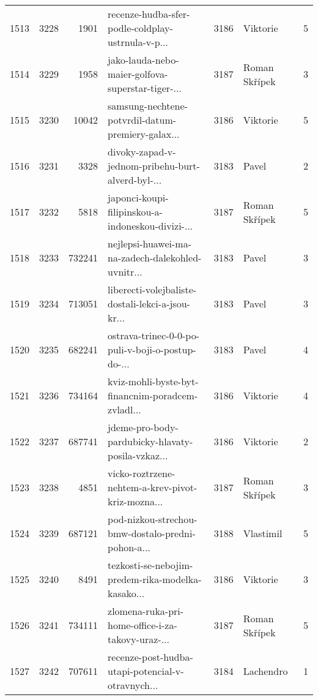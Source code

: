 \begin{tabular}{lrrlrlr}
1513 &       3228 &     1901 &  recenze-hudba-sfer-podle-coldplay-ustrnula-v-p... &     3186 &                     Viktorie &               5 \\
1514 &       3229 &     1958 &  jako-lauda-nebo-maier-golfova-superstar-tiger-... &     3187 &                Roman Skřípek &               3 \\
1515 &       3230 &    10042 &  samsung-nechtene-potvrdil-datum-premiery-galax... &     3186 &                     Viktorie &               5 \\
1516 &       3231 &     3328 &  divoky-zapad-v-jednom-pribehu-burt-alverd-byl-... &     3183 &                        Pavel &               2 \\
1517 &       3232 &     5818 &  japonci-koupi-filipinskou-a-indoneskou-divizi-... &     3187 &                Roman Skřípek &               5 \\
1518 &       3233 &   732241 &  nejlepsi-huawei-ma-na-zadech-dalekohled-uvnitr... &     3183 &                        Pavel &               3 \\
1519 &       3234 &   713051 &  liberecti-volejbaliste-dostali-lekci-a-jsou-kr... &     3183 &                        Pavel &               3 \\
1520 &       3235 &   682241 &  ostrava-trinec-0-0-po-puli-v-boji-o-postup-do-... &     3183 &                        Pavel &               4 \\
1521 &       3236 &   734164 &  kviz-mohli-byste-byt-financnim-poradcem-zvladl... &     3186 &                     Viktorie &               4 \\
1522 &       3237 &   687741 &  jdeme-pro-body-pardubicky-hlavaty-posila-vzkaz... &     3186 &                     Viktorie &               2 \\
1523 &       3238 &     4851 &  vicko-roztrzene-nehtem-a-krev-pivot-kriz-mozna... &     3187 &                Roman Skřípek &               3 \\
1524 &       3239 &   687121 &  pod-nizkou-strechou-bmw-dostalo-predni-pohon-a... &     3188 &                    Vlastimil &               5 \\
1525 &       3240 &     8491 &  tezkosti-se-nebojim-predem-rika-modelka-kasako... &     3186 &                     Viktorie &               3 \\
1526 &       3241 &   734111 &  zlomena-ruka-pri-home-office-i-za-takovy-uraz-... &     3187 &                Roman Skřípek &               5 \\
1527 &       3242 &   707611 &  recenze-post-hudba-utapi-potencial-v-otravnych... &     3184 &                    Lachendro &               1 \\

\end{tabular}
